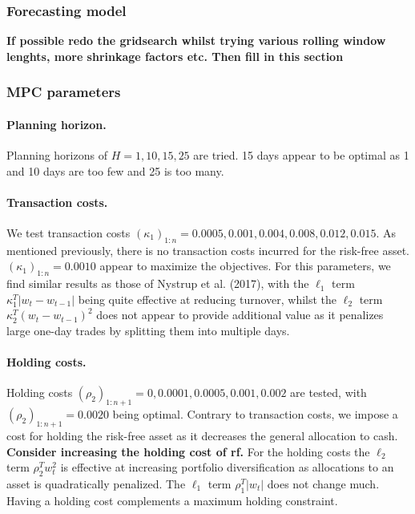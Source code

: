 \subsubsection*{Forecasting model}

\textbf{If possible redo the gridsearch whilst trying various rolling window lenghts, more shrinkage factors etc. Then fill in this section}

\subsubsection*{MPC parameters}

\paragraph{\textbf{Planning horizon.}} Planning horizons of $H=1,10,15,25$ are tried. 15 days appear to be optimal as 1 and 10 days are too few and 25 is too many.

\paragraph{\textbf{Transaction costs.}} We test transaction costs $(\kappa_1)_{1:n}=0.0005, 0.001, 0.004, 0.008, 0.012, 0.015$. As mentioned previously, there is no transaction costs incurred for the risk-free asset. $(\kappa_1)_{1:n}=0.0010$ appear to maximize the objectives. For this parameters, we find similar results as those of Nystrup et al. (2017), with the $\ell_1$ term $\kappa_1^T|w_t-w_{t-1}|$ being quite effective at reducing turnover, whilst the $\ell_2$ term $\kappa_2^T(w_t-w_{t-1})^2$ does not appear to provide additional value as it penalizes large one-day trades by splitting them into multiple days.

\paragraph{\textbf{Holding costs.}} Holding costs $(\rho_2)_{1:n+1}=0, 0.0001, 0.0005, 0.001, 0.002$ are tested, with $(\rho_2)_{1:n+1}=0.0020$ being optimal. Contrary to transaction costs, we impose a cost for holding the risk-free asset as it decreases the general allocation to cash. \textbf{Consider increasing the holding cost of rf.} For the holding costs the $\ell_2$ term $\rho_2^Tw_t^2$ is effective at increasing portfolio diversification as allocations to an asset is quadratically penalized. The $\ell_1$ term $\rho_1^T|w_t|$ does not change much. Having a holding cost complements a maximum holding constraint.

